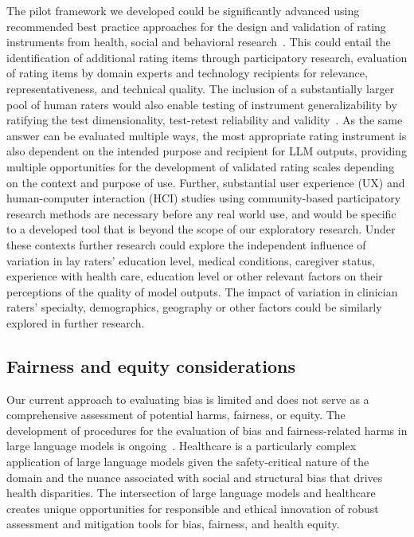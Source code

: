 \documentclass[10pt, letter, onecolumn]{arxiv}
\begin{document}
\begin{refsection}
The pilot framework we developed could be significantly advanced using recommended best practice approaches for the design and validation of rating instruments from health, social and behavioral research~\cite{boateng2018best}. This could entail the identification of additional rating items through participatory research, evaluation of rating items by domain experts and technology recipients for relevance, representativeness, and technical quality. The inclusion of a substantially larger pool of human raters would also enable testing of instrument generalizability by ratifying the test dimensionality, test-retest reliability and validity~\cite{boateng2018best}.  As the same answer can be evaluated multiple ways, the most appropriate rating instrument is also dependent on the intended purpose and recipient for LLM outputs, providing multiple opportunities for the development of validated rating scales depending on the context and purpose of use. Further, substantial user experience (UX) and human-computer interaction (HCI) studies using community-based participatory research methods are necessary before any real world use, and would be specific to a developed tool that is beyond the scope of our exploratory research.  Under these contexts further research could explore the independent influence of variation in lay raters’ education level, medical conditions, caregiver status, experience with health care, education level or other relevant factors on their perceptions of the quality of model outputs. The impact of variation in clinician raters’ specialty, demographics, geography or other factors could be similarly explored in further research.

\subsection{Fairness and equity considerations}
Our current approach to evaluating bias is limited and does not serve as a comprehensive assessment of potential harms, fairness, or equity. The development of procedures for the evaluation of bias and fairness-related harms in large language models is ongoing~\cite{weidinger2021ethical, liang2022holistic}. Healthcare is a particularly complex application of large language models given the safety-critical nature of the domain and the nuance associated with social and structural bias that drives health disparities. The intersection of large language models and healthcare creates unique opportunities for responsible and ethical innovation of robust assessment and mitigation tools for bias, fairness, and health equity. 


\end{refsection}
\end{document}
